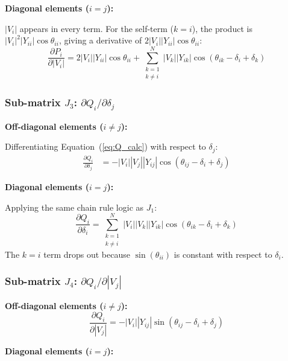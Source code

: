\documentclass[12pt, a4paper]{article}
\begin{document}
\textbf{Diagonal elements ($i = j$):}

$|V_i|$ appears in every term. For the self-term ($k = i$), the product is $|V_i|^2 |Y_{ii}|\cos\theta_{ii}$, giving a derivative of $2|V_i||Y_{ii}|\cos\theta_{ii}$:
\begin{equation}
\frac{\partial P_i}{\partial |V_i|} = 2|V_i| |Y_{ii}| \cos\theta_{ii} + \sum_{\substack{k=1 \\ k \neq i}}^{N} |V_k| |Y_{ik}| \cos(\theta_{ik} - \delta_i + \delta_k)
\label{eq:J2_diag}
\end{equation}

\subsubsection{Sub-matrix \texorpdfstring{$J_3$: $\partial Q_i / \partial \delta_j$}{J3: dQi/ddeltaj}}

\textbf{Off-diagonal elements ($i \neq j$):}

Differentiating Equation~(\ref{eq:Q_calc}) with respect to $\delta_j$:
\begin{align}
\frac{\partial Q_i}{\partial \delta_j} &= -|V_i| |V_j| |Y_{ij}| \cos(\theta_{ij} - \delta_i + \delta_j) \label{eq:J3_offdiag}
\end{align}

\textbf{Diagonal elements ($i = j$):}

Applying the same chain rule logic as $J_1$:
\begin{equation}
\frac{\partial Q_i}{\partial \delta_i} = \sum_{\substack{k=1 \\ k \neq i}}^{N} |V_i| |V_k| |Y_{ik}| \cos(\theta_{ik} - \delta_i + \delta_k)
\label{eq:J3_diag}
\end{equation}
The $k = i$ term drops out because $\sin(\theta_{ii})$ is constant with respect to $\delta_i$.

\subsubsection{Sub-matrix \texorpdfstring{$J_4$: $\partial Q_i / \partial |V_j|$}{J4: dQi/d|Vj|}}

\textbf{Off-diagonal elements ($i \neq j$):}
\begin{equation}
\frac{\partial Q_i}{\partial |V_j|} = -|V_i| |Y_{ij}| \sin(\theta_{ij} - \delta_i + \delta_j) \label{eq:J4_offdiag}
\end{equation}

\textbf{Diagonal elements ($i = j$):}
\end{document}
